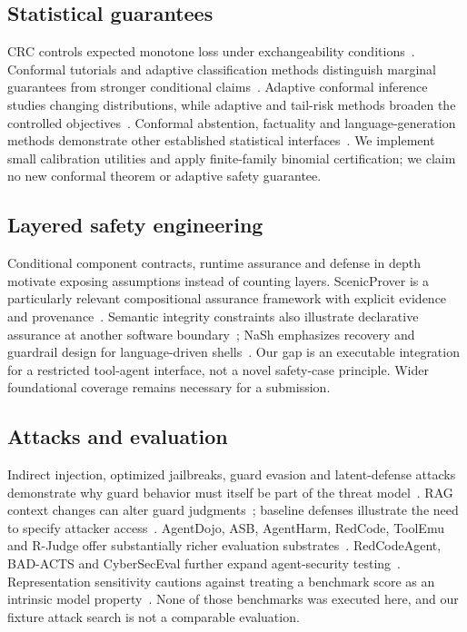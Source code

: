 \documentclass[lettersize,journal]{IEEEtran}
\begin{document}
\subsection{Statistical guarantees}
CRC controls expected monotone loss under exchangeability
conditions~\cite{arxiv220802814}. Conformal tutorials and adaptive
classification methods distinguish marginal guarantees from stronger
conditional claims~\cite{arxiv210707511,arxiv200602544}.
Adaptive conformal inference studies changing distributions, while adaptive
and tail-risk methods broaden the controlled objectives~\cite{arxiv210600170,arxiv240617819,arxiv250220285}.
Conformal abstention, factuality and language-generation methods demonstrate
other established statistical interfaces~\cite{arxiv240501563,arxiv240210978,arxiv230610193,arxiv230518404,arxiv240301216}.
We implement small calibration utilities and apply finite-family binomial
certification; we claim no new conformal theorem or adaptive safety guarantee.

\subsection{Layered safety engineering}
Conditional component contracts, runtime assurance and defense in depth
motivate exposing assumptions instead of counting layers. ScenicProver is a
particularly relevant compositional assurance framework with explicit evidence
and provenance~\cite{arxiv251102164}. Semantic integrity constraints also
illustrate declarative assurance at another software
boundary~\cite{arxiv250300600}; NaSh emphasizes recovery and guardrail design
for language-driven shells~\cite{arxiv250613028}. Our gap is an executable
integration for a restricted tool-agent interface, not a novel safety-case
principle. Wider foundational coverage remains necessary for a submission.

\subsection{Attacks and evaluation}
Indirect injection, optimized jailbreaks, guard evasion and latent-defense
attacks demonstrate why guard behavior must itself be part of the threat
model~\cite{arxiv230212173,arxiv230715043,arxiv250411168,arxiv241209565,arxiv250305264}.
RAG context changes can alter guard judgments~\cite{arxiv251005310}; baseline
defenses illustrate the need to specify attacker access~\cite{arxiv230900614}.
AgentDojo, ASB, AgentHarm, RedCode, ToolEmu and R-Judge offer substantially
richer evaluation substrates~\cite{arxiv240613352,arxiv241002644,arxiv241009024,arxiv241107781,arxiv230915817,arxiv240110019}.
RedCodeAgent, BAD-ACTS and CyberSecEval further expand agent-security
testing~\cite{arxiv251002609,arxiv250816481,arxiv240801605}.
Representation sensitivity cautions against treating a benchmark score as an
intrinsic model property~\cite{arxiv261003585}. None of those benchmarks was
executed here, and our fixture attack search is not a comparable evaluation.
\end{document}
